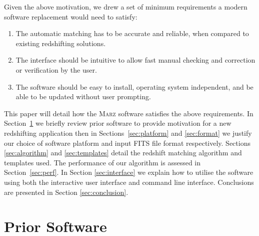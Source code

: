 \documentclass[5p]{elsarticle}
\newcommand{\marz}{\textsc{Marz}}
\begin{document}
Given the above motivation, we drew a set of minimum requirements a modern software replacement would need to satisfy:
\begin{enumerate}
\item The automatic matching has to be accurate and reliable, when compared to existing redshifting solutions.
\item The interface should be intuitive to allow fast manual checking and correction or verification by the user.
\item The software should be easy to install, operating system independent, and be able to be updated without user prompting.
\end{enumerate}
This paper will detail how the \marz{} software satisfies the above requirements. In Section~\ref{sec:prior} we briefly review prior software to provide motivation for a new redshifting application then in Sections~\ref{sec:platform} and \ref{sec:format} we justify our choice of software platform and input FITS file format respectively. Sections \ref{sec:algorithm} and \ref{sec:templates} detail the redshift matching algorithm and templates used.  The performance of our algorithm is assessed in Section~\ref{sec:perf}. In Section \ref{sec:interface} we explain how to utilise the software using both the interactive user interface and command line interface. Conclusions are presented in Section \ref{sec:conclusion}.

\section{Prior Software} \label{sec:prior}
\end{document}
